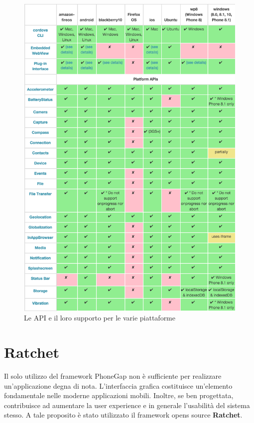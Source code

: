 \begin{figure}[H]
	\centering
	\includegraphics[scale=0.8]{Implementazione/phonegap_api.png}
	\caption{Le API e il loro supporto per le varie piattaforme}
	\label{fig:tabella_api}
\end{figure}

\section{Ratchet}
Il solo utilizzo del framework PhoneGap non è sufficiente per realizzare un'applicazione degna di nota. L'interfaccia grafica costituisce un'elemento fondamentale nelle moderne applicazioni mobili. Inoltre, se ben progettata, contribuisce ad aumentare la user experience \cite{EXPERIENCE} e in generale l'usabilità del sistema stesso. A tale proposito è stato utilizzato il framework opens source \textbf{Ratchet}.

